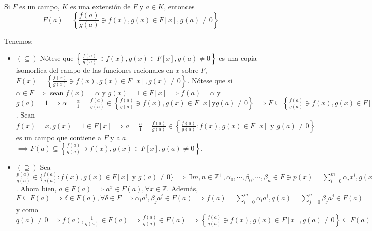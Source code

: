 \begin{prop}
    Si $F$ es un campo, $K$ es una extensión de $F$ y $a\in K$, entonces $$F(a)=\left\{\frac{f(a)}{g(a)}\ni f(x),g(x)\in F[x],g(a)\neq 0\right\}$$
    \begin{dem}
        Tenemos:
        \begin{itemize}
            \item $(\subseteq)$ Nótese que $\left\{\frac{f(a)}{g(a)}\ni f(x),g(x)\in F[x],g(a)\neq 0\right\}$ es una copia isomorfica del campo de las funciones racionales en $x$ sobre $F$, $F(x)=\left\{\frac{f(x)}{g(x)}\ni f(x),g(x)\in F[x],g(x)\neq 0\right\}$. Nótese que si $\alpha\in F\implies$ sean $f(x)=\alpha$ y $g(x)=1\in F[x]\implies f(a)=\alpha$ y $g(a)=1\implies \alpha = \frac{\alpha}{1}=\frac{f(a)}{g(a)}\in \left\{\frac{f(a)}{g(a)}\ni f(x),g(x)\in F[x] \text{y} g(a)\neq 0\right\}\implies F\subseteq \left\{\frac{f(a)}{g(a)}\ni f(x),g(x)\in F[x],g(a)\neq 0\right\} $. Sean $f(x)=x,g(x)=1\in F[x]\implies a=\frac{a}{1}=\frac{f(a)}{g(a)}\in \left\{\frac{f(a)}{g(a)}: f(x),g(x)\in F[x] \text{ y } g(a)\neq 0\right\}$ es un campo que contiene a $F$ y a $a$. $\implies F(a)\subseteq \left\{\frac{f(a)}{g(a)}\ni f(x),g(x)\in F[x],g(a)\neq 0\right\}$.
            \item $(\supseteq)$ Sea $\frac{p(a)}{q(a)}\in \{\frac{f(a)}{g(a)}:f(x),g(x)\in F[x] \text{ y } g(a)\neq 0\}\implies \exists m,n\in\mathbb{Z}^+,\alpha_0,\cdots,\beta_0,\cdots,\beta_n\in F\ni p(x)=\sum_{i=0}^m \alpha_ix^i, g(x)=\sum_{j=0}^n\beta_jx^j,q(a)=\sum_{j=0}^n \beta_j a^j \neq 0$. Ahora bien, $a\in F(a)\implies a^x \in F(a),\forall x\in\mathbb{Z}$. Además, $F\subseteq F(a)\implies \delta\in F(a),\forall \delta \in F\implies \alpha_ia^i,\beta_ja^j\in F(a)\implies f(a)=\sum_{i=0}^m\alpha_ia^i,q(a)=\sum_{j=0}^n\beta_j a^j\in F(a)$ y como $q(a)\neq 0\implies f(a),\frac{1}{q(a)}\in F(a)\implies \frac{f(a)}{q(a)}\in F(a)\implies\left\{\frac{f(a)}{g(a)}\ni f(x),g(x)\in F[x],g(a)\neq 0\right\}\subseteq F(a)$
        \end{itemize}
    \end{dem}
\end{prop}

